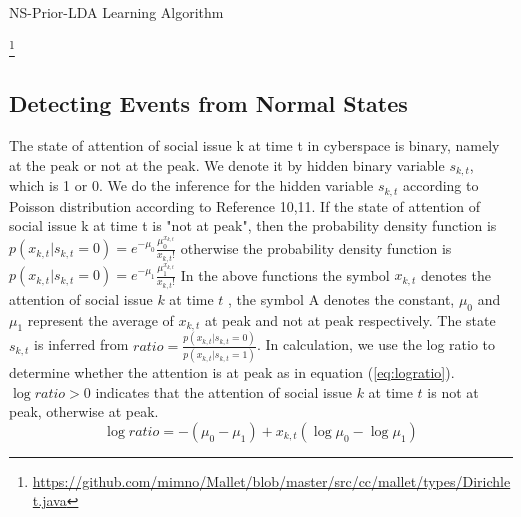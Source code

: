 \documentclass[conference,compsoc]{IEEEtran}
\begin{document}
\begin{algorithm}
\caption{NS-Prior-LDA Learning Algorithm}
\label{alg:gibbsSamplingKBPriorLDA}
\end{algorithm}

\cite{wallach2008structured}\footnote{\url{https://github.com/mimno/Mallet/blob/master/src/cc/mallet/types/Dirichlet.java}}

\subsection{Detecting Events from Normal States}
The state of attention of social issue k at time t in cyberspace is binary, namely at the peak or not at the peak. We denote it by hidden binary variable \(s_{k,t}\), which is 1 or 0. We do the inference for the hidden variable \(s_{k,t}\) according to Poisson distribution according to Reference\cite{Diao:2012wj} 10,11. If the state of attention of social issue k at time t is "not at peak", then the probability density function is 
\(p(x_{k,t}|s_{k,t}=0)=e^{-\mu_0 }  \frac{\mu_0^{x_{k,t}}}{x_{k,t}!}\) otherwise the probability density function is \(p(x_{k,t}|s_{k,t}=0)=e^{-\mu_1 }  \frac{\mu_1^{x_{k,t}}}{x_{k,t}!}\)
In the above functions the symbol \(x_{k,t}\) denotes the attention of social issue \(k\) at time \(t\) , the symbol A denotes the constant, \(\mu_0\) and \(\mu_1\) represent the average of \(x_{k,t}\) at peak and not at peak respectively. The state \(s_{k,t}\) is inferred from \(ratio=\frac{p(x_{k,t} |s_{k,t}=0)}{p(x_{k,t} |s_{k,t}=1)} \).
In calculation, we use the log ratio to determine whether the attention is at peak as in equation (\ref{eq:logratio}). \(\log ratio>0 \) indicates that the attention of social issue \(k\) at time \(t\) is not at peak, otherwise at peak. 
\begin{equation}
\label{eq:logratio}
\log ratio=-(\mu_0-\mu_1 )+x_{k,t}(\log \mu_0 -\log⁡ \mu_1)
\end{equation}
\end{document}
